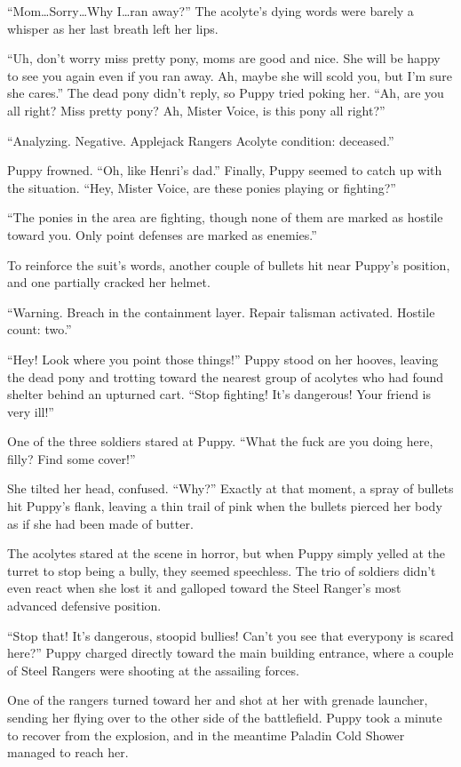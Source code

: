 ``Mom\dots Sorry\dots Why I\dots ran away?'' The acolyte's dying words were barely a whisper as her last breath left her lips.

``Uh, don't worry miss pretty pony, moms are good and nice. She will be happy to see you again even if you ran away. Ah, maybe she will scold you, but I'm sure she cares.'' The dead pony didn't reply, so Puppy tried poking her. ``Ah, are you all right? Miss pretty pony? Ah, Mister Voice, is this pony all right?''

{\mten ``Analyzing. Negative. Applejack Rangers Acolyte condition: deceased.''}

Puppy frowned. ``Oh, like Henri's dad.'' Finally, Puppy seemed to catch up with the situation. ``Hey, Mister Voice, are these ponies playing or fighting?''

{\mten ``The ponies in the area are fighting, though none of them are marked as hostile toward you. Only point defenses are marked as enemies.''}

To reinforce the suit's words, another couple of bullets hit near Puppy's position, and one partially cracked her helmet.

{\mten ``Warning. Breach in the containment layer. Repair talisman activated. Hostile count: two.''}

``Hey! Look where you point those things!'' Puppy stood on her hooves, leaving the dead pony and trotting toward the nearest group of acolytes who had found shelter behind an upturned cart. ``Stop fighting! It's dangerous! Your friend is very ill!''

One of the three soldiers stared at Puppy. ``What the fuck are you doing here, filly? Find some cover!''

She tilted her head, confused. ``Why?'' Exactly at that moment, a spray of bullets hit Puppy's flank, leaving a thin trail of pink when the bullets pierced her body as if she had been made of butter.

The acolytes stared at the scene in horror, but when Puppy simply yelled at the turret to stop being a bully, they seemed speechless. The trio of soldiers didn't even react when she lost it and galloped toward the Steel Ranger's most advanced defensive position.

``Stop that! It's dangerous, stoopid bullies! Can't you see that everypony is scared here?'' Puppy charged directly toward the main building entrance, where a couple of Steel Rangers were shooting at the assailing forces.

One of the rangers turned toward her and shot at her with grenade launcher, sending her flying over to the other side of the battlefield. Puppy took a minute to recover from the explosion, and in the meantime Paladin Cold Shower managed to reach her.

